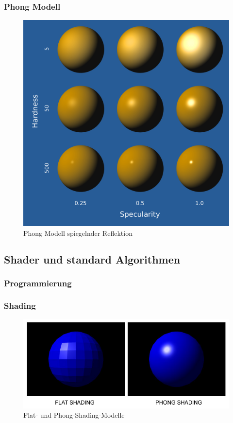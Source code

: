 \subsubsection{Phong Modell}
\begin{figure}[H]
    \centering
    \includegraphics[width=1.0\textwidth]{images/phong.png}
    \caption{Phong Modell spiegelnder Reflektion}
    \label{fig:reflection-phong-specular-model}
\end{figure}





\subsection{Shader und standard Algorithmen}
\subsubsection{Programmierung}

\subsubsection{Shading}
\begin{figure}[H]
    \centering
    \includegraphics[width=1.0\textwidth]{images/phong_flat_shading.jpg}
    \caption{Flat- und Phong-Shading-Modelle}
    \label{fig:shading-flat-phong-models}
\end{figure}

